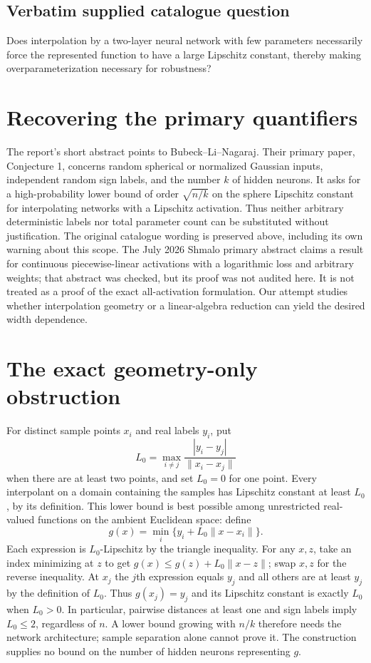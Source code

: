 \documentclass[11pt]{article}
\begin{document}
\subsection{Verbatim supplied catalogue question}
Does interpolation by a two-layer neural network with few parameters necessarily force the represented function to have a large Lipschitz constant, thereby making overparameterization necessary for robustness?

\section{Recovering the primary quantifiers}
The report's short abstract points to Bubeck--Li--Nagaraj. Their
primary paper, Conjecture 1, concerns random spherical or normalized
Gaussian inputs, independent random sign labels, and the number
$k$ of hidden neurons. It asks for a high-probability lower bound
of order $\sqrt{n/k}$ on the sphere Lipschitz constant for
interpolating networks with a Lipschitz activation. Thus neither
arbitrary deterministic labels nor total parameter count can be
substituted without justification. The original catalogue wording
is preserved above, including its own warning about this scope.
The July 2026 Shmalo primary abstract claims a result for continuous
piecewise-linear activations with a logarithmic loss and arbitrary
weights; that abstract was checked, but its proof was not audited
here. It is not treated as a proof of the exact all-activation
formulation. Our attempt studies whether interpolation geometry
or a linear-algebra reduction can yield the desired width dependence.

\section{The exact geometry-only obstruction}
For distinct sample points $x_i$ and real labels $y_i$, put
\[
 L_0=\max_{i\ne j}\frac{|y_i-y_j|}{\|x_i-x_j\|}
\]
when there are at least two points, and set $L_0=0$ for one point.
Every interpolant on a domain containing the samples has Lipschitz
constant at least $L_0$, by its definition. This lower bound is
best possible among unrestricted real-valued functions on the
ambient Euclidean space: define
\[
 g(x)=\min_i\{y_i+L_0\|x-x_i\|\}.
\]
Each expression is $L_0$-Lipschitz by the triangle inequality.
For any $x,z$, take an index minimizing at $z$ to get
$g(x)\le g(z)+L_0\|x-z\|$; swap $x,z$ for the reverse inequality.
At $x_j$ the $j$th expression equals $y_j$ and all others are at
least $y_j$ by the definition of $L_0$. Thus $g(x_j)=y_j$ and its
Lipschitz constant is exactly $L_0$ when $L_0>0$.
In particular, pairwise distances at least one and sign labels
imply $L_0\le2$, regardless of $n$. A lower bound growing with
$n/k$ therefore needs the network architecture; sample separation
alone cannot prove it. The construction supplies no bound on the
number of hidden neurons representing $g$.
\end{document}

